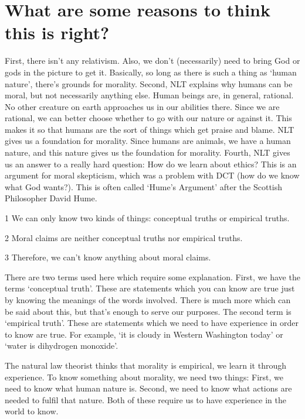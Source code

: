 \section{What are some reasons to think this is right?}

First, there isn't any relativism. Also, we don’t (necessarily) need to bring God or gods in the picture to get it. Basically, so long as there is such a thing as ‘human nature’, there’s grounds for morality. Second, NLT explains why humans can be moral, but not necessarily anything else. Human beings are, in general, rational. No other creature on earth approaches us in our abilities there. Since we are rational, we can better choose whether to go with our nature or against it. This makes it so that humans are the sort of things which get praise and blame. NLT gives us a foundation for morality. Since humans are animals, we have a human nature, and this nature gives us the foundation for morality. Fourth, NLT gives us an answer to a really hard question: How do we learn about ethics? This is an argument for moral skepticism, which was a problem with DCT (how do we know what God wants?). This is often called ‘Hume’s Argument’ after the Scottish Philosopher David Hume.
\begin{earg}
    \item[1] We can only know two kinds of things: conceptual truths or empirical truths.
    \item[2] Moral claims are neither conceptual truths nor empirical truths.
    \item[3] Therefore, we can’t know anything about moral claims.
\end{earg}

There are two terms used here which require some explanation. First, we have the terms `conceptual truth'. These are statements which you can know are true just by knowing the meanings of the words involved. There is much more which can be said about this, but that's enough to serve our purposes. The second term is `empirical truth'. These are statements which we need to have experience in order to know are true. For example, `it is cloudy in Western Washington today' or `water is dihydrogen monoxide'. 

The natural law theorist thinks that morality is empirical, we learn it through experience. To know something about morality, we need two things: First, we need to know what human nature is. Second, we need to know what actions are needed to fulfil that nature. Both of these require us to have experience in the world to know.

